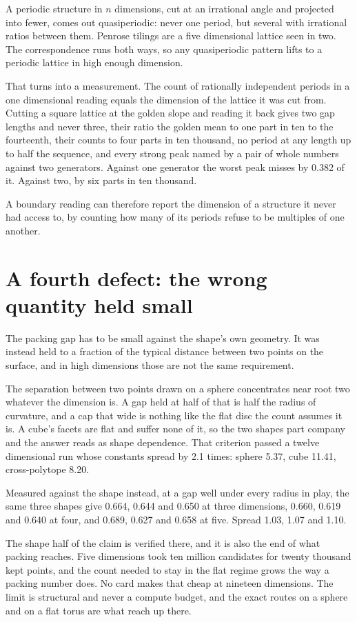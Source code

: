 A periodic structure in $n$ dimensions, cut at an irrational angle and projected into fewer, comes
out quasiperiodic: never one period, but several with irrational ratios between them. Penrose
tilings are a five dimensional lattice seen in two. The correspondence runs both ways, so any
quasiperiodic pattern lifts to a periodic lattice in high enough dimension.

That turns into a measurement. The count of rationally independent periods in a one dimensional
reading equals the dimension of the lattice it was cut from. Cutting a square lattice at the golden
slope and reading it back gives two gap lengths and never three, their ratio the golden mean to one
part in ten to the fourteenth, their counts to four parts in ten thousand, no period at any length
up to half the sequence, and every strong peak named by a pair of whole numbers against two
generators. Against one generator the worst peak misses by 0.382 of it. Against two, by six parts in
ten thousand.

A boundary reading can therefore report the dimension of a structure it never had access to, by counting
how many of its periods refuse to be multiples of one another.

\section{A fourth defect: the wrong quantity held small}

The packing gap has to be small against the shape's own geometry. It was instead held to a fraction
of the typical distance between two points on the surface, and in high dimensions those are not the
same requirement.

The separation between two points drawn on a sphere concentrates near root two whatever the
dimension is. A gap held at half of that is half the radius of curvature, and a cap that wide is
nothing like the flat disc the count assumes it is. A cube's facets are flat and suffer none of it,
so the two shapes part company and the answer reads as shape dependence. That criterion passed a
twelve dimensional run whose constants spread by 2.1 times: sphere 5.37, cube 11.41, cross-polytope
8.20.

Measured against the shape instead, at a gap well under every radius in play, the same three shapes
give 0.664, 0.644 and 0.650 at three dimensions, 0.660, 0.619 and 0.640 at four, and 0.689, 0.627
and 0.658 at five. Spread 1.03, 1.07 and 1.10.

The shape half of the claim is verified there, and it is also the end of what packing reaches. Five
dimensions took ten million candidates for twenty thousand kept points, and the count needed to stay
in the flat regime grows the way a packing number does. No card makes that cheap at nineteen
dimensions. The limit is structural and never a compute budget, and the exact routes on a sphere and
on a flat torus are what reach up there.

